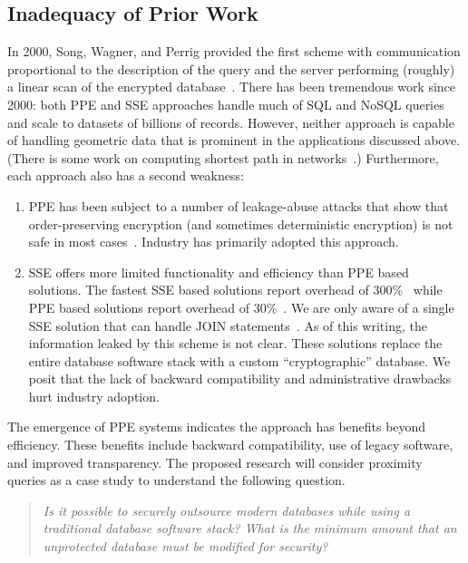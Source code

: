 \subsection{Inadequacy of Prior Work}

In 2000, Song, Wagner, and Perrig provided the first scheme with communication proportional to the description of the query and the server performing (roughly) a linear scan of the encrypted database~\cite{SP:SonWagPer00}.  There has been tremendous work since 2000: both PPE and SSE approaches handle much of SQL and NoSQL queries and scale to datasets of billions of records.  However, neither approach is capable of handling geometric data that is prominent in the applications discussed above. (There is some work on computing shortest path in networks~\cite{CCS:MKNK15}.)  Furthermore, each approach also has a second weakness:
\begin{enumerate}
\item PPE has been subject to a number of leakage-abuse attacks that show that order-preserving encryption (and sometimes deterministic encryption) is not safe in most cases~\cite{CCS:NavKamWri15,CCS:CGPR15,CCS:KKNO16,CCS:PouWri16,CCS:GMNRS16,EPRINT:GSBNR16,EPRINT:ZhaKatPap16}.  Industry has primarily adopted this approach.
\item SSE offers more limited functionality and efficiency than PPE based solutions.  The fastest SSE based solutions report overhead of 300\%~\cite{C:CJJKRS13,CCS:JJKRS13,NDSS:CJJJKR14,ESORICS:FJKNRS15} while PPE based solutions report overhead of 30\%~\cite{CACM:PRZB12}.  We are only aware of a single SSE solution that can handle JOIN statements~\cite{EPRINT:KamMoa16}.  As of this writing, the information  leaked by this scheme is not clear.  These solutions replace the entire database software stack with a custom ``cryptographic'' database.  We posit that the lack of backward compatibility and administrative drawbacks hurt industry adoption.  
\end{enumerate}

The emergence of PPE systems indicates the approach has benefits beyond efficiency.  These benefits include backward compatibility, use of legacy software, and improved transparency.
The proposed research will
consider proximity queries as a case study to understand the following question.  \begin{quote}\emph{Is it possible to securely outsource modern databases while using a traditional database software stack?  What is the minimum amount that an unprotected database must be modified for security?}\end{quote}


